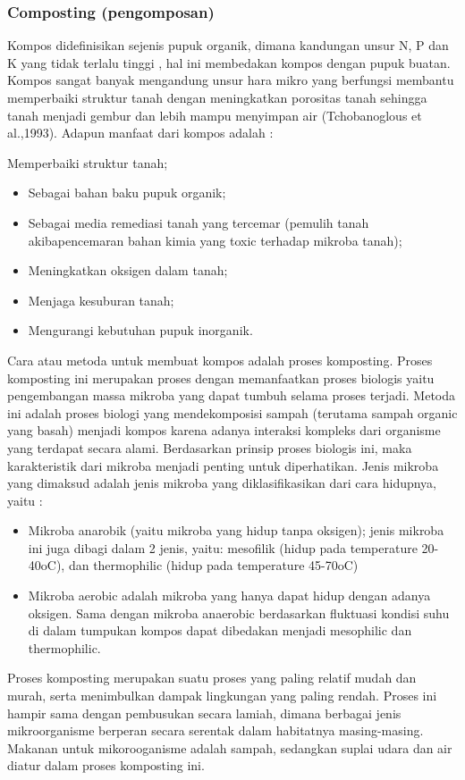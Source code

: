 \documentclass[../wastek.tex]{subfiles}
\begin{document}
\subsubsection{Composting (pengomposan)}%
\label{ssub:composting_(pengomposan)}
Kompos didefinisikan sejenis pupuk organik, dimana kandungan unsur N, P dan K yang tidak terlalu tinggi , hal ini membedakan kompos dengan pupuk buatan. Kompos sangat banyak mengandung unsur hara mikro yang berfungsi membantu memperbaiki struktur tanah dengan meningkatkan porositas tanah sehingga tanah menjadi gembur dan lebih mampu menyimpan air (Tchobanoglous et al.,1993). Adapun manfaat dari kompos adalah :

Memperbaiki struktur tanah;
\begin{itemize}
	\item Sebagai bahan baku pupuk organik;
	\item Sebagai media remediasi tanah yang tercemar (pemulih tanah akibapencemaran bahan kimia yang toxic terhadap mikroba tanah);
	\item Meningkatkan oksigen dalam tanah;
	\item Menjaga kesuburan tanah;
	\item Mengurangi kebutuhan pupuk inorganik.
\end{itemize}

Cara atau metoda untuk membuat kompos adalah proses komposting. Proses komposting ini merupakan proses dengan memanfaatkan proses biologis yaitu pengembangan massa mikroba yang dapat tumbuh selama proses terjadi. Metoda ini adalah proses biologi yang mendekomposisi sampah (terutama sampah organic yang basah) menjadi kompos karena adanya interaksi kompleks dari organisme yang terdapat secara alami. Berdasarkan prinsip proses biologis ini, maka karakteristik dari mikroba menjadi penting untuk diperhatikan. Jenis mikroba yang dimaksud adalah jenis mikroba yang diklasifikasikan dari cara hidupnya, yaitu :

\begin{itemize}
	\item Mikroba anarobik (yaitu mikroba yang hidup tanpa oksigen); jenis mikroba ini juga dibagi dalam 2 jenis, yaitu: mesofilik (hidup pada temperature 20-40oC), dan thermophilic (hidup pada temperature 45-70oC)
	\item Mikroba aerobic adalah mikroba yang hanya dapat hidup dengan adanya oksigen. Sama dengan mikroba anaerobic berdasarkan fluktuasi kondisi suhu di dalam tumpukan kompos dapat dibedakan menjadi mesophilic dan thermophilic.
\end{itemize}
Proses komposting merupakan suatu proses yang paling relatif mudah dan murah, serta menimbulkan dampak lingkungan yang paling rendah. Proses ini hampir sama dengan pembusukan secara lamiah, dimana berbagai jenis mikroorganisme berperan secara serentak dalam habitatnya masing-masing. Makanan untuk mikorooganisme adalah sampah, sedangkan suplai udara dan air diatur dalam proses komposting ini.
\end{document}
